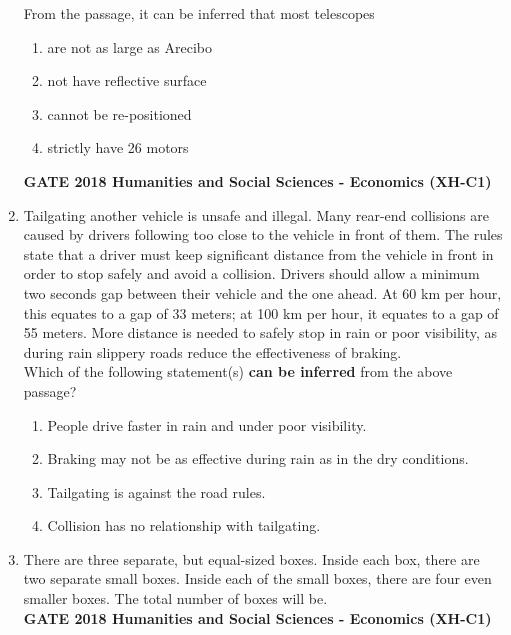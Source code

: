 \documentclass[journal,12pt,onecolumn]{exam}
\theoremstyle{remark}
\begin{document}
\begin{enumerate}
\vspace{1em}

From the passage, it can be inferred that most telescopes 


\begin{enumerate}
    \item are not as large as Arecibo 
    \item not have reflective surface 
    \item cannot be re-positioned 
    \item strictly have 26 motors
\end{enumerate}
\textbf{GATE 2018 Humanities and Social Sciences - Economics (XH-C1)}
 \item Tailgating another vehicle is unsafe and illegal. Many rear-end collisions are caused by drivers following too close to the vehicle in front of them. The rules state that a driver must keep significant distance from the vehicle in front in order to stop safely and avoid a collision. Drivers should allow a minimum two seconds gap between their vehicle and the one ahead. At 60 km per hour, this equates to a gap of 33 meters; at 100 km per hour, it equates to a gap of 55 meters. More distance is needed to safely stop in rain or poor visibility, as during rain slippery roads reduce the effectiveness of braking.\\

    Which of the following statement(s) \textbf{can be inferred} from the above passage?

  
    

    \begin{enumerate}
        \item People drive faster in rain and under poor visibility.
        \item Braking may not be as effective during rain as in the dry conditions.
        \item Tailgating is against the road rules.
        \item Collision has no relationship with tailgating.
    \end{enumerate}


\item There are three separate, but equal-sized boxes. Inside each box, there are two
separate small boxes. Inside each of the small boxes, there are four even smaller
boxes. The total number of boxes will be\underline{\hspace{2cm}}.\\


\textbf{GATE 2018 Humanities and Social Sciences - Economics (XH-C1)}\ 


\end{enumerate}
\end{document}
